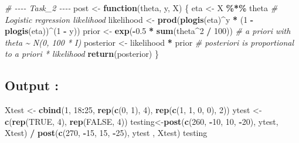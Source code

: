 \documentclass[
]{article}
\newenvironment{Shaded}{\begin{snugshade}}{\end{snugshade}}
\newcommand{\CommentTok}[1]{\textcolor[rgb]{0.56,0.35,0.01}{\textit{#1}}}
\newcommand{\ConstantTok}[1]{\textcolor[rgb]{0.56,0.35,0.01}{#1}}
\newcommand{\ControlFlowTok}[1]{\textcolor[rgb]{0.13,0.29,0.53}{\textbf{#1}}}
\newcommand{\DecValTok}[1]{\textcolor[rgb]{0.00,0.00,0.81}{#1}}
\newcommand{\FloatTok}[1]{\textcolor[rgb]{0.00,0.00,0.81}{#1}}
\newcommand{\FunctionTok}[1]{\textcolor[rgb]{0.13,0.29,0.53}{\textbf{#1}}}
\newcommand{\NormalTok}[1]{#1}
\newcommand{\OtherTok}[1]{\textcolor[rgb]{0.56,0.35,0.01}{#1}}
\newcommand{\SpecialCharTok}[1]{\textcolor[rgb]{0.81,0.36,0.00}{\textbf{#1}}}
\begin{document}
\begin{Shaded}
\begin{Highlighting}[]
\CommentTok{\# {-}{-}{-}{-} Task\_2 {-}{-}{-}{-}}
\NormalTok{post }\OtherTok{\textless{}{-}} \ControlFlowTok{function}\NormalTok{(theta, y, X) \{}
\NormalTok{  eta }\OtherTok{\textless{}{-}}\NormalTok{ X }\SpecialCharTok{\%*\%}\NormalTok{ theta }\CommentTok{\# Logistic regression likelihood}
\NormalTok{  likelihood }\OtherTok{\textless{}{-}} \FunctionTok{prod}\NormalTok{(}\FunctionTok{plogis}\NormalTok{(eta)}\SpecialCharTok{\^{}}\NormalTok{y }\SpecialCharTok{*}\NormalTok{ (}\DecValTok{1} \SpecialCharTok{{-}} \FunctionTok{plogis}\NormalTok{(eta))}\SpecialCharTok{\^{}}\NormalTok{(}\DecValTok{1} \SpecialCharTok{{-}}\NormalTok{ y))}
\NormalTok{  prior }\OtherTok{\textless{}{-}} \FunctionTok{exp}\NormalTok{(}\SpecialCharTok{{-}}\FloatTok{0.5} \SpecialCharTok{*} \FunctionTok{sum}\NormalTok{(theta}\SpecialCharTok{\^{}}\DecValTok{2} \SpecialCharTok{/} \DecValTok{100}\NormalTok{)) }\CommentTok{\# a priori with theta \textasciitilde{} N(0, 100 * I)}
\NormalTok{  posterior }\OtherTok{\textless{}{-}}\NormalTok{ likelihood }\SpecialCharTok{*}\NormalTok{ prior }\CommentTok{\# posteriori is proportional to a priori * likelihood}
  \FunctionTok{return}\NormalTok{(posterior)}
\NormalTok{\}}
\end{Highlighting}
\end{Shaded}

\subsection{Output :}\label{output-1}

\begin{Shaded}
\begin{Highlighting}[]
\NormalTok{Xtest }\OtherTok{\textless{}{-}} \FunctionTok{cbind}\NormalTok{(}\DecValTok{1}\NormalTok{, }\DecValTok{18}\SpecialCharTok{:}\DecValTok{25}\NormalTok{, }\FunctionTok{rep}\NormalTok{(}\FunctionTok{c}\NormalTok{(}\DecValTok{0}\NormalTok{, }\DecValTok{1}\NormalTok{), }\DecValTok{4}\NormalTok{), }\FunctionTok{rep}\NormalTok{(}\FunctionTok{c}\NormalTok{(}\DecValTok{1}\NormalTok{, }\DecValTok{1}\NormalTok{, }\DecValTok{0}\NormalTok{, }\DecValTok{0}\NormalTok{), }\DecValTok{2}\NormalTok{))}
\NormalTok{ytest }\OtherTok{\textless{}{-}} \FunctionTok{c}\NormalTok{(}\FunctionTok{rep}\NormalTok{(}\ConstantTok{TRUE}\NormalTok{, }\DecValTok{4}\NormalTok{), }\FunctionTok{rep}\NormalTok{(}\ConstantTok{FALSE}\NormalTok{, }\DecValTok{4}\NormalTok{))}
\NormalTok{testing}\OtherTok{\textless{}{-}}\FunctionTok{post}\NormalTok{(}\FunctionTok{c}\NormalTok{(}\DecValTok{260}\NormalTok{, }\SpecialCharTok{{-}}\DecValTok{10}\NormalTok{, }\DecValTok{10}\NormalTok{, }\SpecialCharTok{{-}}\DecValTok{20}\NormalTok{), ytest, Xtest) }\SpecialCharTok{/} \FunctionTok{post}\NormalTok{(}\FunctionTok{c}\NormalTok{(}\DecValTok{270}\NormalTok{, }\SpecialCharTok{{-}}\DecValTok{15}\NormalTok{, }\DecValTok{15}\NormalTok{, }\SpecialCharTok{{-}}\DecValTok{25}\NormalTok{), ytest , Xtest)}
\NormalTok{testing}
\end{Highlighting}
\end{Shaded}
\end{document}
